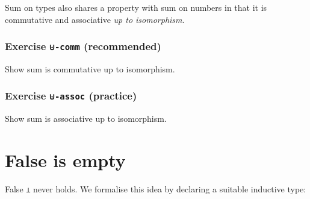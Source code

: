 Sum on types also shares a property with sum on numbers in that it is
commutative and associative \emph{up to isomorphism}.

\hypertarget{exercise--comm-recommended}{%
\subsubsection{\texorpdfstring{Exercise \texttt{⊎-comm}
(recommended)}{Exercise ⊎-comm (recommended)}}\label{exercise--comm-recommended}}

Show sum is commutative up to isomorphism.

\begin{fence}
\begin{code}%
\>[0]\<%
\end{code}
\end{fence}

\hypertarget{exercise--assoc-practice}{%
\subsubsection{\texorpdfstring{Exercise \texttt{⊎-assoc}
(practice)}{Exercise ⊎-assoc (practice)}}\label{exercise--assoc-practice}}

Show sum is associative up to isomorphism.

\begin{fence}
\begin{code}%
\>[0]\<%
\end{code}
\end{fence}

\hypertarget{false-is-empty}{%
\section{False is empty}\label{false-is-empty}}

False \texttt{⊥} never holds. We formalise this idea by declaring a
suitable inductive type:

\begin{fence}
\begin{code}%
\>[0]\AgdaSpace{}%
\AgdaSpace{}%
\AgdaSymbol{:}\AgdaSpace{}%
\AgdaSpace{}%
\<%
\\
\>[0][@{}l@{\AgdaIndent{0}}]%
\>[2]\<%
\end{code}
\end{fence}

